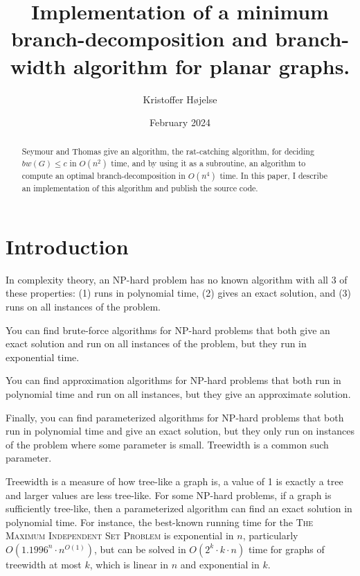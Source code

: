 \documentclass{article}
\title{Implementation of a minimum branch-decomposition and branch-width algorithm for planar graphs.}
\author{Kristoffer Højelse}
\date{February 2024}
\begin{document}
\maketitle


\begin{abstract}
	Seymour and Thomas give an algorithm, the rat-catching algorithm, for deciding $bw(G) \leq c$ in $O(n^2)$ time, and by using it as a subroutine, an algorithm to compute an optimal branch-decomposition in $O(n^4)$ time. In this paper, I describe an implementation of this algorithm and publish the source code.
\end{abstract}


\section{Introduction}

	In complexity theory, an NP-hard problem has no known algorithm with all 3 of these properties: (1) runs in polynomial time, (2) gives an exact solution, and (3) runs on all instances of the problem.

	You can find brute-force algorithms for NP-hard problems that both give an exact solution and run on all instances of the problem, but they run in exponential time.

	You can find approximation algorithms for NP-hard problems that both run in polynomial time and run on all instances, but they give an approximate solution.

	Finally, you can find parameterized algorithms for NP-hard problems that both run in polynomial time and give an exact solution, but they only run on instances of the problem where some parameter is small. Treewidth is a common such parameter.
	
	Treewidth is a measure of how tree-like a graph is, a value of 1 is exactly a tree and larger values are less tree-like. For some NP-hard problems, if a graph is sufficiently tree-like, then a parameterized algorithm can find an exact solution in polynomial time. For instance, the best-known running time for the \textsc{The Maximum Independent Set Problem} is exponential in $n$, particularly $O(1.1996^n \cdot n^{O(1)})$\cite{XN17}, but can be solved in $O(2^k \cdot k \cdot n)$ time for graphs of treewidth at most $k$, which is linear in $n$ and exponential in $k$.
\end{document}
